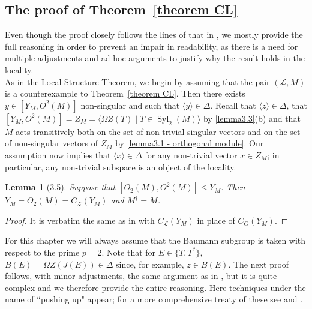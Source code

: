 \documentclass{amsart}
\numberwithin{equation}{section}
\newtheorem{lemma}[equation]{Lemma}
\theoremstyle{definition}
\theoremstyle{subresult}
\theoremstyle{caseresult}
\renewcommand{\L}{\mathcal{L}}
\newcommand{\Syl}{\operatorname{Syl}}
\newcommand{\<}{\langle}
\renewcommand{\>}{\rangle}
\begin{document}
\subsection{The proof of Theorem~\ref{theorem CL}}

Even though the proof closely follows the lines of that in \cite{Meier-Stell-Stroth:2012}, we mostly provide the full reasoning in order to prevent an impair in readability, as there is a need for multiple adjustments and ad-hoc arguments to justify why the result holds in the locality.\\
As in the Local Structure Theorem, we begin by assuming that the pair $(\L,M)$ is a counterexample to Theorem~\ref{theorem CL}. Then there exists $y \in [Y_M,O^2(M)]$ non-singular and such that $\< y \> \in \Delta$. Recall that $\< z \> \in \Delta$, that $[Y_M,O^2(M)]=Z_M=\< \Omega Z(T) \mid T \in \Syl_2(M) \>$ by \ref{lemma3.3}(b) and that $M$ acts transitively both on the set of non-trivial singular vectors and on the set of non-singular vectors of $Z_M$ by \ref{lemma3.1 - orthogonal module}. Our assumption now implies that $\< x \> \in \Delta$ for any non-trivial vector $x \in Z_M$; in particular, any non-trivial subspace is an object of the locality.

\begin{lemma}[3.5]\label{lemma3.5}
	Suppose that $[O_2(M),O^2(M)] \le Y_M$. Then $Y_M=O_2(M)=C_\L(Y_M)$ and $M^\dagger =M$.
\end{lemma}
\begin{proof}
	It is verbatim the same as in \cite[Lemma 3.5]{Meier-Stell-Stroth:2012} with $C_\L(Y_M)$ in place of $C_G(Y_M)$.
\end{proof}

For this chapter we will always assume that the Baumann subgroup is taken with respect to the prime $p=2$. Note that for $E \in \{T,T^*\}$, $B(E) = \Omega Z (J(E)) \in \Delta$ since, for example, $z \in B(E)$. The next proof follows, with minor adjustments, the same argument as in \cite{Meier-Stell-Stroth:2012}, but it is quite complex and we therefore provide the entire reasoning. Here techniques under the name of ``pushing up" appear; for a more comprehensive treaty of these see \cite[Section 2.1]{Meier-Stellm-Stroth:2003} and \cite[Section 2]{PPS:2003}.
\end{document}
